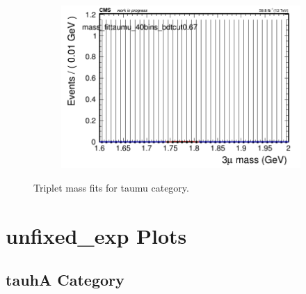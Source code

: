 \begin{figure}[H]
\begin{subfigure}{0.2\textwidth}
        \caption{}
    \end{subfigure}
    \begin{subfigure}{0.2\textwidth}
        \includegraphics[width=\textwidth]{flat_fit/plots/taumu/massfit_taumu_40bins_bdtcut0.67.png}
        \caption{}
    \end{subfigure}
    \caption{Triplet mass fits for taumu category.}
    \label{fig:flatfittaumu}
\end{figure}

\section{unfixed\_exp Plots}

\subsection{tauhA Category}
\label{sec:unfixedexptauhA}


